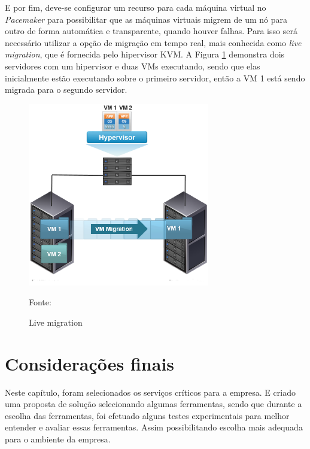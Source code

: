 E por fim, deve-se configurar um recurso para cada máquina virtual no \textit{Pacemaker} para possibilitar que as
máquinas virtuais migrem de um nó para outro de forma automática e transparente, quando houver falhas. Para isso será necessário utilizar a 
opção de migração em tempo real, mais conhecida como \textit{live migration}, que é fornecida pelo hipervisor \ac{KVM}.
A Figura \ref{fig:vms_migration} demonstra dois servidores com um hipervisor e duas \ac{VM}s executando, sendo que elas inicialmente estão 
executando sobre o primeiro servidor, então a \ac{VM} 1 está sendo migrada para o segundo servidor.


\begin{figure}[h!]
 \centering
 \includegraphics[width=300px]{img/vms_migration.eps}
 \caption{Live migration}
 Fonte: \citet{spaniol2015}
 \label{fig:vms_migration}
\end{figure}

\section{Considerações finais}

Neste capítulo, foram selecionados os serviços críticos para a empresa. E criado uma proposta de solução selecionando algumas ferramentas,
sendo que durante a escolha das ferramentas, foi efetuado alguns testes experimentais para melhor entender e avaliar essas ferramentas. 
Assim possibilitando escolha mais adequada para o ambiente da empresa.

